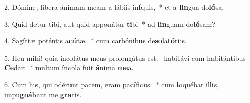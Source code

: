 2. Dómine, líbera ánimam meam a lábiis in\textbf{í}quis,~*  et a \textbf{lin}gua do\textbf{ló}sa.\

3. Quid detur tibi, aut quid apponátur \textbf{ti}bi~*  ad \textbf{lin}guam do\textbf{ló}sam?\

4. Sagíttæ poténtis a\textbf{cú}tæ,~*  cum carbónibus de\textbf{so}la\textbf{tó}riis.\

5. Heu mihi! quia incolátus meus prolongátus est: \dag\  habitávi cum habitántibus \textbf{Ce}dar:~*  multum íncola fuit \textbf{á}nima \textbf{me}a.\

6. Cum his, qui odérunt pacem, eram pa\textbf{cí}ficus:~*  cum loquébar illis, impu\textbf{gná}bant me \textbf{gra}tis.\

